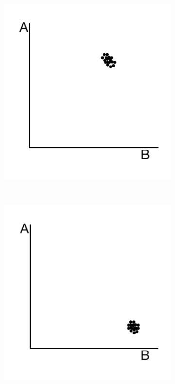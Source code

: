 \begin{figure}
\begin{subfigure}[b]{0.3\textwidth}
        \includegraphics[width=1\textwidth]{PolyMarker/Figures/deletions/homFalse.pdf}
        \label{fig:poly:homFalse}
    \end{subfigure}
    ~
    \begin{subfigure}[b]{0.3\textwidth}
        \caption{}
        \includegraphics[width=1\textwidth]{PolyMarker/Figures/deletions/homReal.pdf}

\end{subfigure}
\end{figure}

